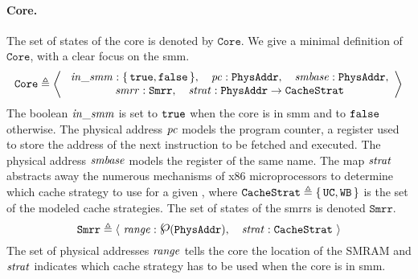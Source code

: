 \paragraph{Core.}
%
The set of states of the core is denoted by $\texttt{Core}$.
%
We give a minimal definition of $\texttt{Core}$, with a clear focus on the
\ac{smm}.
%
\[
  \texttt{Core} \triangleq \left<\
    \begin{array}{c}
      \mathit{in\_smm} : \{\,\mathtt{true},
      \mathtt{false}\,\},\quad\mathit{pc}: \texttt{PhysAddr},\quad\mathit{smbase} :
      \texttt{PhysAddr}, \\
      \mathit{smrr} : \texttt{Smrr},\quad\mathit{strat} :
      \texttt{PhysAddr} \rightarrow \texttt{CacheStrat}
    \end{array}
  \right>
\]
%
The boolean $\mathit{in\_smm}$ is set to $\mathtt{true}$ when the core is in \ac{smm}
and to $\mathtt{false}$ otherwise.
%
The physical address $\mathit{pc}$ models the program counter, a register used to
store the address of the next instruction to be fetched and executed.
%
The physical address $\mathit{smbase}$ models the register of the same name.
%
The map $\mathit{strat}$ abstracts away the numerous mechanisms of x86
microprocessors to determine which cache strategy to use for a given \IO, where
$\texttt{CacheStrat} \triangleq \{\,\mathtt{UC}, \mathtt{WB}\,\}$ is the set of
the modeled cache strategies.
%
The set of states of the \acp{smrr} is denoted $\texttt{Smrr}$.
%
%
\[
  \texttt{Smrr} \triangleq \langle~\func{range}:
  \powerset(\texttt{PhysAddr}),\quad\func{strat}: \texttt{CacheStrat}~\rangle
\]
%
The set of physical addresses $\mathit{range}$ tells the core the location of the
SMRAM and $\mathit{strat}$ indicates which cache strategy has to be used when the
core is in \ac{smm}.


